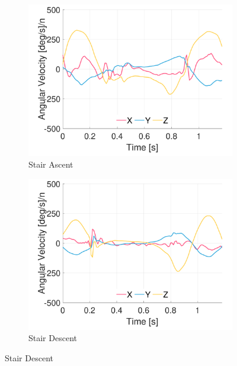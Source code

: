 \begin{figure}[p]
    \begin{subfigure}[b]{0.49\textwidth}
         \centering
         \includegraphics[width=\textwidth]{content/3-Methods/example-data/ch3_example_data_subject_01_l_ankle_gyro_activity_stair_down.pdf}
         \caption{Stair Ascent}
    \end{subfigure}
    \begin{subfigure}[b]{0.49\textwidth}
         \centering
         \includegraphics[width=\textwidth]{content/3-Methods/example-data/ch3_example_data_subject_01_l_ankle_gyro_activity_stair_up.pdf}
         \caption{Stair Descent}
    \end{subfigure}
    

\end{figure}
